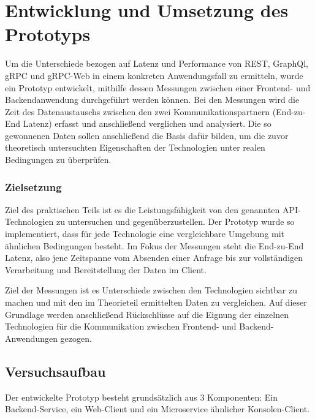 \chapter{Entwicklung und Umsetzung des Prototyps}
\label{chap:intro}
\chapterstart

Um die Unterschiede bezogen auf Latenz und Performance von REST, GraphQl, gRPC und gRPC-Web in einem konkreten Anwendungsfall zu ermitteln, wurde ein Prototyp entwickelt, mithilfe dessen Messungen zwischen einer Frontend- und Backendanwendung durchgeführt werden können. 
Bei den Messungen wird die Zeit des Datenaustauschs zwischen den zwei Kommunikationspartnern (End-zu-End Latenz) erfasst und anschließend verglichen und analysiert.
Die so gewonnenen Daten sollen anschließend die Basis dafür bilden, 
um die zuvor theoretisch untersuchten Eigenschaften der Technologien unter realen Bedingungen zu überprüfen.

\subsection*{Zielsetzung}
Ziel des praktischen Teils ist es die Leistungsfähigkeit von den genannten API-Technologien zu untersuchen und gegenüberzustellen. Der Prototyp wurde so implementiert, dass für jede Technologie eine vergleichbare Umgebung mit ähnlichen Bedingungen besteht. 
Im Fokus der Messungen steht die End-zu-End Latenz, also jene Zeitspanne vom Absenden einer Anfrage bis zur vollständigen Verarbeitung und Bereitstellung der Daten im Client. 

Ziel der Messungen ist es Unterschiede zwischen den Technologien sichtbar zu machen und mit den im Theorieteil ermittelten Daten zu vergleichen.
Auf dieser Grundlage werden anschließend Rückschlüsse auf die Eignung der einzelnen Technologien für die Kommunikation zwischen Frontend- und Backend-Anwendungen gezogen.


\section{Versuchsaufbau}
Der entwickelte Prototyp besteht grundsätzlich aus 3 Komponenten: 
Ein Backend-Service, ein Web-Client und ein Microservice ähnlicher Konsolen-Client.

